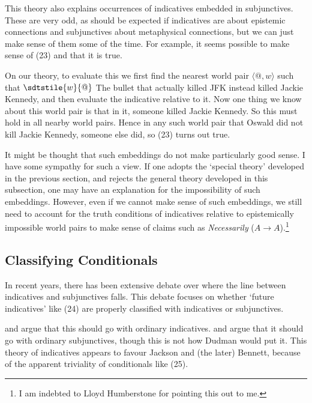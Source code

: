 This theory also explains occurrences of indicatives embedded in subjunctives. These are very odd, as should be expected if indicatives are about epistemic connections and subjunctives about metaphysical connections, but we can just make sense of them some of the time. For example, it seems possible to make sense of (23) and that it is true.


\noindent On our theory, to evaluate this we first find the nearest world pair \(\langle @, w \rangle\) such that \(\sdtstile{w}{@}\) The bullet that actually killed JFK instead killed Jackie Kennedy, and then evaluate the indicative relative to it. Now one thing we know about this world pair is that in it, someone killed Jackie Kennedy. So this must hold in all nearby world pairs. Hence in any such world pair that Oswald did not kill Jackie Kennedy, someone else did, so (23) turns out true.

It might be thought that such embeddings do not make particularly good sense. I have some sympathy for such a view. If one adopts the `special theory' developed in the previous section, and rejects the general theory developed in this subsection, one may have an explanation for the impossibility of such embeddings. However, even if we cannot make sense of such embeddings, we still need to account for the truth conditions of indicatives relative to epistemically impossible world pairs to make sense of claims such as \textit{Necessarily }(\(A \rightarrow A\)).\footnote{I am indebted to Lloyd Humberstone for pointing this out to me.}

\subsection{Classifying Conditionals}
In recent years, there has been extensive debate over where the line between indicatives and subjunctives falls. This debate focuses on whether `future indicatives' like (24) are properly classified with indicatives or subjunctives.


\noindent \citet{Jackson1990} and \citet{Bennett1995} argue that this should go with ordinary indicatives. \citet{Dudman1994} and \citet{Bennett1988} argue that it should go with ordinary subjunctives, though this is not how Dudman would put it. This theory of indicatives appears to favour Jackson and (the later) Bennett, because of the apparent triviality of conditionals like (25).

